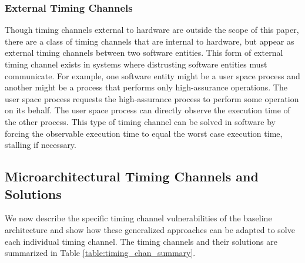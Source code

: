 \subsubsection{External Timing Channels}
Though timing channels external to hardware are outside the scope of this 
paper, there are a class of timing channels that are internal to hardware, but 
appear as external timing channels between two software entities. This form of 
external timing channel exists in systems where distrusting software entities 
must communicate. For example, one software entity might be a user space 
process and another might be a process that performs only high-assurance 
operations. The user space process requests the high-assurance process to 
perform some operation on its behalf. The user space process can directly 
observe the execution time of the other process. This type of timing channel 
can be solved in software by forcing the observable execution time to 
equal the worst case execution time, stalling if necessary.

\subsection{Microarchitectural Timing Channels and Solutions}
We now describe the specific timing channel vulnerabilities of the baseline 
architecture and show how these generalized approaches can be adapted to solve 
each individual timing channel. The timing channels and their solutions are 
summarized in Table \ref{table:timing_chan_summary}.

